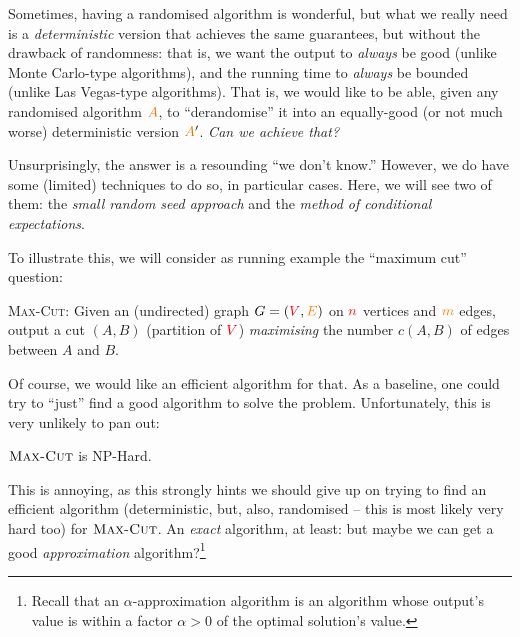 Sometimes, having a randomised algorithm is wonderful, but what we really need is a \emph{deterministic} version that achieves the same guarantees, but without the drawback of randomness: that is, we want the output to \emph{always} be good (unlike Monte Carlo-type algorithms), and the running time to \emph{always} be bounded (unlike Las Vegas-type algorithms). That is, we would like to be able, given any randomised algorithm $\Algo$, to ``derandomise'' it into an equally-good (or not much worse) deterministic version $\Algo'$. \emph{Can we achieve that?}

Unsurprisingly, the answer is a resounding ``we don't know.'' However, we do have some (limited) techniques to do so, in particular cases. Here, we will see two of them: the \emph{small random seed approach} and the \emph{method of conditional expectations}.

To illustrate this, we will consider as running example the ``maximum cut'' question:
\begin{framed}
\noindent \textsc{Max-Cut}: Given an (undirected) graph $G=(\textcolor{red}{V},\textcolor{orange}{E})$ on $\textcolor{red}{n}$ vertices and $\textcolor{orange}{m}$ edges, output a cut $(A,B)$ (partition of $\textcolor{red}{V}$) \emph{maximising} the number $c(A,B)$ of edges between $A$ and $B$.
\end{framed}
Of course, we would like an efficient algorithm for that. As a baseline, one could try to ``just'' find a good algorithm to solve the problem. Unfortunately, this is very unlikely to pan out:
\begin{fact}
    $\textsc{Max-Cut}$ is NP-Hard.
\end{fact}
This is annoying, as this strongly hints we should give up on trying to find an efficient algorithm (deterministic, but, also, randomised -- this is most likely very hard too) for $\textsc{Max-Cut}$. An \emph{exact} algorithm, at least: but maybe we can get a good \emph{approximation} algorithm?\footnote{Recall that an $\alpha$-approximation algorithm is an algorithm whose output's value is within a factor $\alpha > 0$ of the optimal solution's value.}

